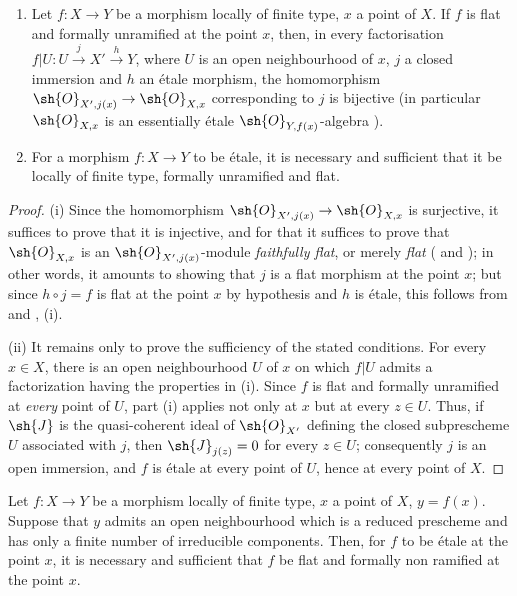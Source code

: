 \begin{corollary}[18.4.12]
\label{IV.18.4.12}
\begin{enumerate}
  \item[(i)] Let $f:X\to Y$ be a morphism locally of finite type, $x$ a point of $X$.
If $f$ is flat and formally unramified at the point $x$, then, in every factorisation $f|U:U\xrightarrow{j}X'\xrightarrow{h}Y$, where $U$ is an open neighbourhood of $x$, $j$ a closed immersion and $h$ an \'etale morphism, the homomorphism $\sh{O}_{X',j(x)}\to\sh{O}_{X,x}$ corresponding to $j$ is bijective (in particular $\sh{O}_{X,x}$ is an essentially \'etale $\sh{O}_{Y,f(x)}$-algebra ).
  \item[(ii)] For a morphism $f:X\to Y$ to be \'etale, it is necessary and sufficient that it be locally of finite type, formally unramified and flat.
\end{enumerate}
\end{corollary}

\begin{proof}
(i) Since the homomorphism $\sh{O}_{X',j(x)}\to\sh{O}_{X,x}$ is surjective, it suffices to prove that it is injective, and for that it suffices to prove that $\sh{O}_{X,x}$ is an $\sh{O}_{X',j(x)}$-module \emph{faithfully flat}, or merely \emph{flat} ( and );
in other words, it amounts to showing that $j$ is a flat morphism at the point $x$;
but since $h\circ j=f$ is flat at the point $x$ by hypothesis and $h$ is \'etale, this follows from  and , (i).

(ii) It remains only to prove the sufficiency of the stated conditions.
For every $x\in X$, there is an open neighbourhood $U$ of $x$ on which $f|U$ admits a factorization having the properties in (i).
Since $f$ is flat and formally unramified at \emph{every} point of $U$, part (i) applies not only at $x$ but at every $z\in U$.
Thus, if $\sh{J}$ is the quasi-coherent ideal of $\sh{O}_{X'}$ defining the closed subprescheme $U$ associated with $j$, then $\sh{J}_{j(z)}=0$ for every $z\in U$; consequently $j$ is an open immersion, and $f$ is \'etale at every point of $U$, hence at every point of $X$.
\end{proof}

\begin{corollary}[18.4.13]
\label{IV.18.4.13}
Let $f:X\to Y$ be a morphism locally of finite type, $x$ a point of $X$, $y=f(x)$.
Suppose that $y$ admits an open neighbourhood which is a reduced prescheme and has only a finite number of irreducible components.
Then, for $f$ to be \'etale at the point $x$, it is necessary and sufficient that $f$ be flat and formally non ramified at the point $x$.
\end{corollary}

